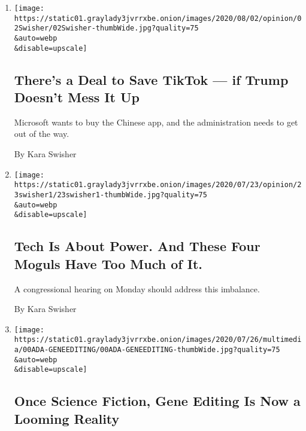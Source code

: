 \begin{enumerate}
\def\labelenumi{\arabic{enumi}.}
\item
  \href{/2020/08/02/opinion/02tik-tok-china-trump.html}{}

  \texttt{[image: https://static01.graylady3jvrrxbe.onion/images/2020/08/02/opinion/02Swisher/02Swisher-thumbWide.jpg?quality=75\\\&auto=webp\\\&disable=upscale]}

  \hypertarget{theres-a-deal-to-save-tiktok--if-trump-doesnt-mess-it-up}{%
  \subsection{There's a Deal to Save TikTok --- if Trump Doesn't Mess It
  Up}\label{theres-a-deal-to-save-tiktok--if-trump-doesnt-mess-it-up}}

  Microsoft wants to buy the Chinese app, and the administration needs
  to get out of the way.

  By Kara Swisher
\item
  \href{/2020/07/23/opinion/tech-moguls-congressional-hearing.html}{}

  \texttt{[image: https://static01.graylady3jvrrxbe.onion/images/2020/07/23/opinion/23swisher1/23swisher1-thumbWide.jpg?quality=75\\\&auto=webp\\\&disable=upscale]}

  \hypertarget{tech-is-about-power-and-these-four-moguls-have-too-much-of-it}{%
  \subsection{Tech Is About Power. And These Four Moguls Have Too Much
  of
  It.}\label{tech-is-about-power-and-these-four-moguls-have-too-much-of-it}}

  A congressional hearing on Monday should address this imbalance.

  By Kara Swisher
\item
  \href{/2020/07/22/style/crispr-gene-editing-ethics.html}{}

  \texttt{[image: https://static01.graylady3jvrrxbe.onion/images/2020/07/26/multimedia/00ADA-GENEEDITING/00ADA-GENEEDITING-thumbWide.jpg?quality=75\\\&auto=webp\\\&disable=upscale]}

  \hypertarget{once-science-fiction-gene-editing-is-now-a-looming-reality}{%
  \subsection{Once Science Fiction, Gene Editing Is Now a Looming
  Reality}\label{once-science-fiction-gene-editing-is-now-a-looming-reality}}


\end{enumerate}

